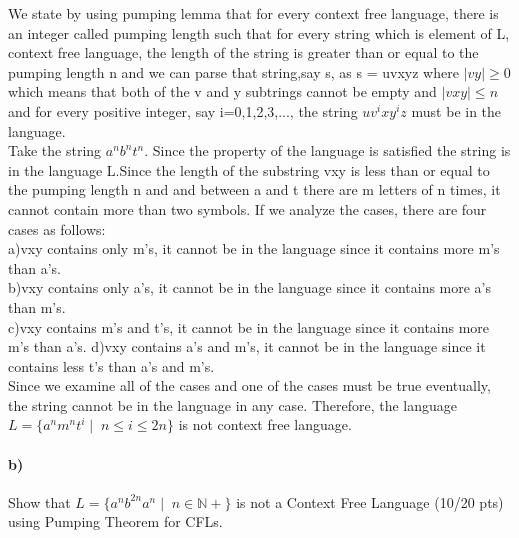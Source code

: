 \documentclass[a4paper,12pt]{article}
\begin{document}
\begin{tcolorbox}
We state by using pumping lemma that for every context free language, there is an integer called pumping length such that for every string which is element of L, context free language, the length of the string is greater than or equal to the pumping length n and we can parse that string,say s, as s = uvxyz where $|vy| \geq 0$ which means that both of the v and y subtrings cannot be empty and $|vxy| \leq n$ and for every positive integer, say i=0,1,2,3,..., the string $uv^ixy^iz$ must be in the language. \\
Take the string $a^nb^nt^n$. Since the property of the language is satisfied the string is in the language L.Since the length of the substring vxy is less than or equal to the pumping length n and and between a and t there are m letters of n times, it cannot contain more than two symbols. If we analyze the cases, there are four cases as follows: \\
a)vxy contains only m's, it cannot be in the language since it contains more m's than a's. \\
b)vxy contains only a's, it cannot be in the language since it contains more a's than m's. \\
c)vxy contains m's and t's, it cannot be in the language since it contains more m's than a's.
d)vxy contains a's and m's, it cannot be in the language since it contains less t's than a's and m's. \\

Since we examine all of the cases and one of the cases must be true eventually, the string cannot be in the language in any case. Therefore, the language $L=\{a^n m^n t^i \mid \; n\leq i \leq 2n\}$ is not context free language.
\end{tcolorbox}


\paragraph{b)} Show that $L=\{a^n b^{2n} a^n \mid \; n \in \mathbb{N+} \}$ is not a Context Free Language \hfill \small{(10/20 pts)} \\
using Pumping Theorem for CFLs. \\
\end{document}
